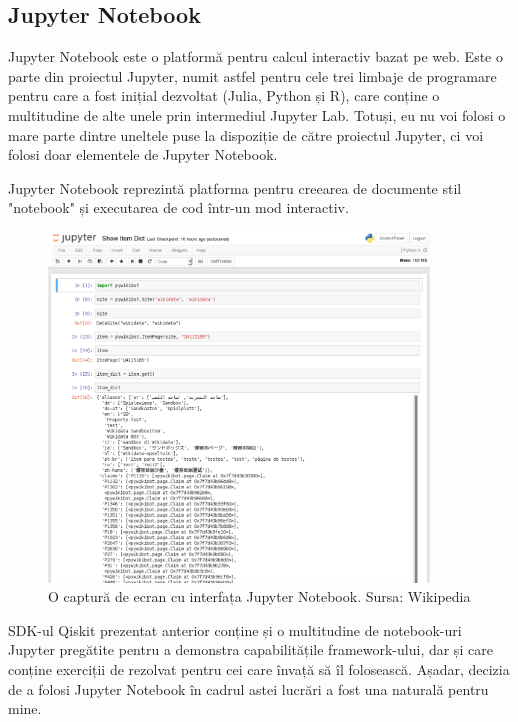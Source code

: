 \subsection{Jupyter Notebook}

Jupyter Notebook este o platformă pentru calcul interactiv bazat pe web. Este o parte din proiectul Jupyter, numit astfel pentru cele trei limbaje de programare pentru care a fost inițial dezvoltat (Julia, Python și R), care conține o multitudine de alte unele prin intermediul Jupyter Lab. Totuși, eu nu voi folosi o mare parte dintre uneltele puse la dispoziție de către proiectul Jupyter, ci voi folosi doar elementele de Jupyter Notebook.

Jupyter Notebook reprezintă platforma pentru creearea de documente stil "notebook" și executarea de cod într-un mod interactiv. 

\begin{figure}[H]
    \centering
    \includegraphics[width=0.9\textwidth]{continut/capitol2/figuri/JupyterNotebookInterface.png}
    \caption{O captură de ecran cu interfața Jupyter Notebook. Sursa: Wikipedia}
    \label{fig:JupyterNotebookInterface}
\end{figure}

SDK-ul Qiskit prezentat anterior conține și o multitudine de notebook-uri Jupyter pregătite pentru a demonstra capabilitățile framework-ului, dar și care conține exerciții de rezolvat pentru cei care învață să îl folosească. Așadar, decizia de a folosi Jupyter Notebook în cadrul astei lucrări a fost una naturală pentru mine.

